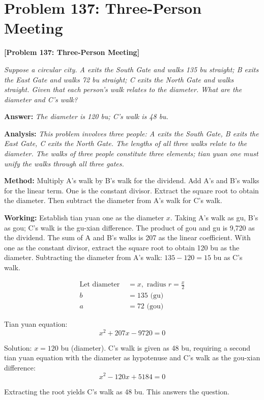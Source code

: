 \documentclass[11pt,a4paper]{book}
\newcommand{\answer}[1]{\noindent\textbf{\color{anacolor}Answer: }\textit{#1}\par}
\newcommand{\method}[1]{\noindent\textbf{\color{methodcolor}Method: }#1\par}
\newcommand{\working}[1]{\noindent\textbf{\color{workcolor}Working: }#1\par}
\newcommand{\analysis}[1]{\noindent\textbf{\color{anacolor}Analysis: }\textit{#1}\par}
\begin{document}
\section{Problem 137: Three-Person Meeting}
\label{sec:prob137}

\noindent\textbf{\color{probcolor}[Problem 137: Three-Person Meeting]}

\textit{Suppose a circular city. A exits the South Gate and walks 135 bu straight; B exits the East Gate and walks 72 bu straight; C exits the North Gate and walks straight. Given that each person's walk relates to the diameter. What are the diameter and C's walk?}

\answer{The diameter is 120 bu; C's walk is 48 bu.}

\analysis{This problem involves three people: A exits the South Gate, B exits the East Gate, C exits the North Gate. The lengths of all three walks relate to the diameter. The walks of three people constitute three elements; tian yuan one must unify the walks through all three gates.}

\method{Multiply A's walk by B's walk for the dividend. Add A's and B's walks for the linear term. One is the constant divisor. Extract the square root to obtain the diameter. Then subtract the diameter from A's walk for C's walk.}

\working{Establish tian yuan one as the diameter $x$. Taking A's walk as gu, B's as gou; C's walk is the gu-xian difference. The product of gou and gu is 9,720 as the dividend. The sum of A and B's walks is 207 as the linear coefficient. With one as the constant divisor, extract the square root to obtain 120 bu as the diameter. Subtracting the diameter from A's walk: $135 - 120 = 15$ bu as C's walk.

\begin{align*}
\text{Let diameter } &= x, \text{ radius } r = \frac{x}{2} \\
b &= 135 \text{ (gu)} \\
a &= 72 \text{ (gou)}
\end{align*}

Tian yuan equation:
$$x^2 + 207x - 9720 = 0$$

Solution: $x = 120$ bu (diameter). C's walk is given as 48 bu, requiring a second tian yuan equation with the diameter as hypotenuse and C's walk as the gou-xian difference:
$$x^2 - 120x + 5184 = 0$$

Extracting the root yields C's walk as 48 bu. This answers the question.}
\end{document}

